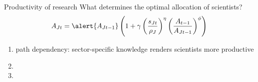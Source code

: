 \documentclass[11pt,aspectratio=169]{beamer}
\begin{document}
\begin{frame}{Productivity of research}
	\vspace{-10mm}
	What determines the optimal allocation of scientists?
	\vspace{4mm}
	\pause
\large
\begin{align*}
		A_{Jt}=\alert{A_{Jt-1}}\left(1+\gamma\left(\frac{s_{Jt}}{\rho_J}\right)^\eta\left(\frac{A_{t-1}}{A_{Jt-1}}\right)^\phi\right)
\end{align*}
\normalsize
\begin{enumerate}
		\item \alert{path dependency: sector-specific knowledge renders scientists more productive}
	\item[] %
	\item[] %
\end{enumerate}
\end{frame}
\end{document}
